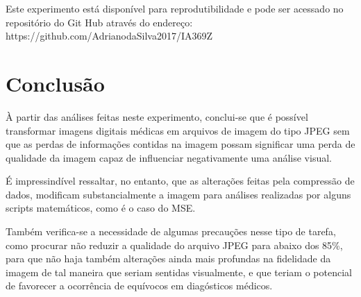 \documentclass{IEEEtran}
\begin{document}
    Este experimento está disponível para reprodutibilidade e pode ser
acessado no repositório do Git Hub através do endereço:
https://github.com/AdrianodaSilva2017/IA369Z 

    \section{Conclusão}\label{conclusuxe3o}

    À partir das análises feitas neste experimento, conclui-se que é
possível transformar imagens digitais médicas em arquivos de imagem do
tipo JPEG sem que as perdas de informações contidas na imagem possam
significar uma perda de qualidade da imagem capaz de influenciar
negativamente uma análise visual.

É impressindível ressaltar, no entanto, que as alterações feitas pela
compressão de dados, modificam substancialmente a imagem para análises
realizadas por alguns scripts matemáticos, como é o caso do MSE.

Também verifica-se a necessidade de algumas precauções nesse tipo de
tarefa, como procurar não reduzir a qualidade do arquivo JPEG para
abaixo dos 85\%, para que não haja também alterações ainda mais
profundas na fidelidade da imagem de tal maneira que seriam sentidas
visualmente, e que teriam o potencial de favorecer a ocorrência de
equívocos em diagósticos médicos. 

    


    
    



    
    
\end{document}
